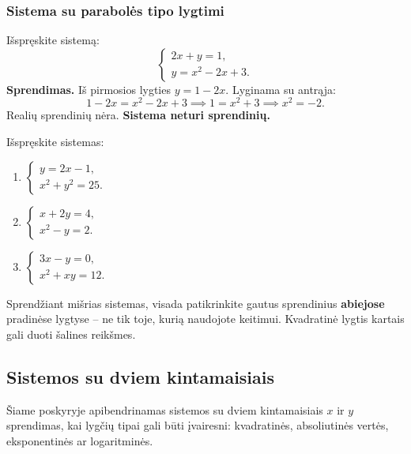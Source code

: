 \subsubsection*{Sistema su parabolės tipo lygtimi}

\begin{example}
Išspręskite sistemą:
\[
  \begin{cases}
    2x + y = 1,\\
    y = x^2 - 2x + 3.
  \end{cases}
\]
\textbf{Sprendimas.} Iš pirmosios lygties $y = 1 - 2x$. Lyginama su antrąja:
\[
  1 - 2x = x^2 - 2x + 3 \implies 1 = x^2 + 3 \implies x^2 = -2.
\]
Realių sprendinių nėra. \textbf{Sistema neturi sprendinių.}
\end{example}

\begin{exercise}
Išspręskite sistemas:
\begin{enumerate}[label=\alph*)]
  \item $\begin{cases} y = 2x - 1,\\ x^2 + y^2 = 25. \end{cases}$
  \item $\begin{cases} x + 2y = 4,\\ x^2 - y = 2. \end{cases}$
  \item $\begin{cases} 3x - y = 0,\\ x^2 + xy = 12. \end{cases}$
\end{enumerate}
\end{exercise}

\begin{tcolorbox}[title={Dažna klaida!}, colback=red!5!white, colframe=red!75!black]
Sprendžiant mišrias sistemas, visada patikrinkite gautus sprendinius \textbf{abiejose} pradinėse lygtyse -- ne tik toje, kurią naudojote keitimui. Kvadratinė lygtis kartais gali duoti šalines reikšmes.
\end{tcolorbox}


\subsection{Sistemos su dviem kintamaisiais}

Šiame poskyryje apibendrinamas sistemos su dviem kintamaisiais $x$ ir $y$ sprendimas, kai lygčių tipai gali būti įvairesni: kvadratinės, absoliutinės vertės, eksponentinės ar logaritminės.

